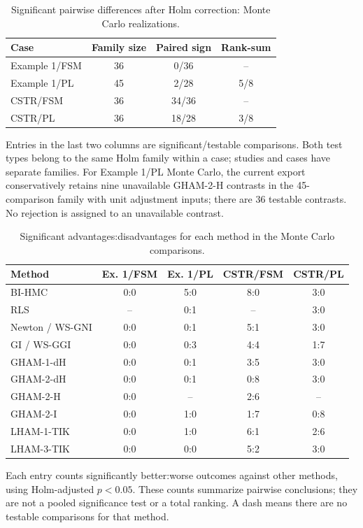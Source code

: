 \begin{table}[!htbp]
\centering
\small
\caption{Significant pairwise differences after Holm correction: Monte Carlo realizations.}
\label{tab:expstats_summary_montecarlo}
\setlength{\tabcolsep}{5pt}
\renewcommand{\arraystretch}{1.12}
\begin{tabular}{@{}lccc@{}}
\toprule
Case & Family size & Paired sign & Rank-sum \\
\midrule
Example 1/FSM & 36 & 0/36 & -- \\
Example 1/PL & 45 & 2/28 & 5/8 \\
CSTR/FSM & 36 & 34/36 & -- \\
CSTR/PL & 36 & 18/28 & 3/8 \\
\bottomrule
\end{tabular}
\par\smallskip
\begin{minipage}{\linewidth}\footnotesize
Entries in the last two columns are significant/testable comparisons. Both test types belong to the same Holm family within a case; studies and cases have separate families. For Example 1/PL Monte Carlo, the current export conservatively retains nine unavailable GHAM-2-H contrasts in the 45-comparison family with unit adjustment inputs; there are 36 testable contrasts. No rejection is assigned to an unavailable contrast.
\end{minipage}
\end{table}
\begin{table}[!htbp]
\centering
\small
\caption{Significant advantages:disadvantages for each method in the Monte Carlo comparisons.}
\label{tab:expstats_advantages_montecarlo}
\setlength{\tabcolsep}{5pt}
\renewcommand{\arraystretch}{1.12}
\begin{tabular}{@{}lcccc@{}}
\toprule
Method & Ex. 1/FSM & Ex. 1/PL & CSTR/FSM & CSTR/PL \\
\midrule
BI-HMC & 0:0 & 5:0 & 8:0 & 3:0 \\
RLS & -- & 0:1 & -- & 3:0 \\
Newton / WS-GNI & 0:0 & 0:1 & 5:1 & 3:0 \\
GI / WS-GGI & 0:0 & 0:3 & 4:4 & 1:7 \\
GHAM-1-dH & 0:0 & 0:1 & 3:5 & 3:0 \\
GHAM-2-dH & 0:0 & 0:1 & 0:8 & 3:0 \\
GHAM-2-H & 0:0 & -- & 2:6 & -- \\
GHAM-2-I & 0:0 & 1:0 & 1:7 & 0:8 \\
LHAM-1-TIK & 0:0 & 1:0 & 6:1 & 2:6 \\
LHAM-3-TIK & 0:0 & 0:0 & 5:2 & 3:0 \\
\bottomrule
\end{tabular}
\par\smallskip
\begin{minipage}{\linewidth}\footnotesize
Each entry counts significantly better:worse outcomes against other methods, using Holm-adjusted $p<0.05$. These counts summarize pairwise conclusions; they are not a pooled significance test or a total ranking. A dash means there are no testable comparisons for that method.
\end{minipage}
\end{table}
